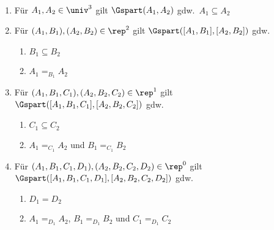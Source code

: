 % 
%     
    \begin{satz}\ \vspace{0pt}

        \begin{enumerate}
            \item Für $A_1, A_2 \in \univ^3$ gilt $\Gspart(A_1,A_2)$ gdw.\ $A_1 \subseteq A_2$
            \item Für $(A_1,B_1), (A_2,B_2) \in \rep^2$ gilt $\Gspart([A_1,B_1],[A_2,B_2])$ gdw. 
                \begin{enumerate}
                    \item $B_1 \subseteq B_2$
                    \item $A_1 =_{B_1} A_2$
                \end{enumerate}	
            \item Für $(A_1,B_1,C_1), (A_2,B_2,C_2) \in \rep^1$ gilt\\
                $\Gspart([A_1,B_1,C_1],[A_2,B_2,C_2])$ gdw. 
                \begin{enumerate}
                    \item $C_1 \subseteq C_2$
                    \item $A_1 =_{C_1} A_2$ und $B_1 =_{C_1} B_2$
                \end{enumerate}	
            \item Für $(A_1,B_1,C_1,D_1), (A_2,B_2,C_2,D_2) \in \rep^0$ gilt\\
                $\Gspart([A_1,B_1,C_1,D_1],[A_2,B_2,C_2,D_2])$ gdw.
                \begin{enumerate}
                    \item $D_1 = D_2$
                    \item $A_1 =_{D_1} A_2$, $B_1 =_{D_1} B_2$ und $C_1 =_{D_1} C_2$
                \end{enumerate}	
        \end{enumerate}
        
    \end{satz}

